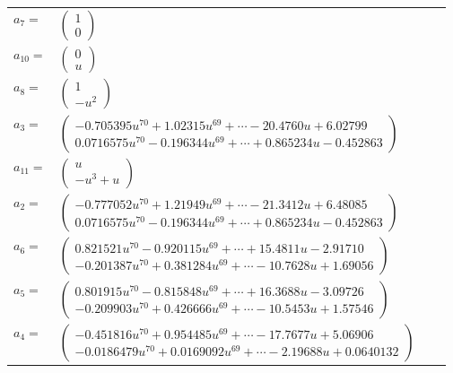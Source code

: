 \documentclass[1p]{elsarticle_modified}
\theoremstyle{definition}
\begin{document}
\begin{tabular}{m{7pt} m{180pt} m{7pt} m{180pt} }
\flushright $a_{7}=$&$\begin{pmatrix}1\\0\end{pmatrix}$ \\
\flushright $a_{10}=$&$\begin{pmatrix}0\\u\end{pmatrix}$ \\
\flushright $a_{8}=$&$\begin{pmatrix}1\\- u^2\end{pmatrix}$ \\
\flushright $a_{3}=$&$\begin{pmatrix}-0.705395 u^{70}+1.02315 u^{69}+\cdots-20.4760 u+6.02799\\0.0716575 u^{70}-0.196344 u^{69}+\cdots+0.865234 u-0.452863\end{pmatrix}$ \\
\flushright $a_{11}=$&$\begin{pmatrix}u\\- u^3+u\end{pmatrix}$ \\
\flushright $a_{2}=$&$\begin{pmatrix}-0.777052 u^{70}+1.21949 u^{69}+\cdots-21.3412 u+6.48085\\0.0716575 u^{70}-0.196344 u^{69}+\cdots+0.865234 u-0.452863\end{pmatrix}$ \\
\flushright $a_{6}=$&$\begin{pmatrix}0.821521 u^{70}-0.920115 u^{69}+\cdots+15.4811 u-2.91710\\-0.201387 u^{70}+0.381284 u^{69}+\cdots-10.7628 u+1.69056\end{pmatrix}$ \\
\flushright $a_{5}=$&$\begin{pmatrix}0.801915 u^{70}-0.815848 u^{69}+\cdots+16.3688 u-3.09726\\-0.209903 u^{70}+0.426666 u^{69}+\cdots-10.5453 u+1.57546\end{pmatrix}$ \\
\flushright $a_{4}=$&$\begin{pmatrix}-0.451816 u^{70}+0.954485 u^{69}+\cdots-17.7677 u+5.06906\\-0.0186479 u^{70}+0.0169092 u^{69}+\cdots-2.19688 u+0.0640132\end{pmatrix}$ \\

\end{tabular}
\end{document}
